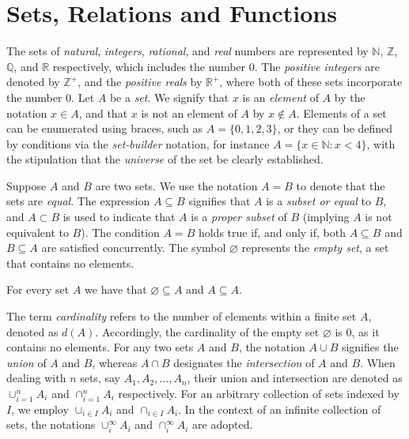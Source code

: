 %
%

\section{Sets, Relations and Functions}
\label{sec:sets}

The sets of \emph{natural}, \emph{integers}, \emph{rational}, and \emph{real} numbers are represented by $\mathbb{N}$, $\mathbb{Z}$, $\mathbb{Q}$, and $\mathbb{R}$ respectively, which includes the number $0$. The \emph{positive integers} are denoted by $\mathbb{Z}^+$, and the \emph{positive reals} by $\mathbb{R}^+$, where both of these sets incorporate the number $0$. Let $A$ be a \emph{set}. We signify that $x$ is an \emph{element} of $A$ by the notation $x\in A$, and that $x$ is not an element of $A$ by $x \notin A$. Elements of a set can be enumerated using braces, such as $A = \{0, 1, 2, 3\}$, or they can be defined by conditions via the \emph{set-builder} notation, for instance $A = \{x \in \mathbb{N} : x < 4\}$, with the stipulation that the \emph{universe} of the set be clearly established.

Suppose $A$ and $B$ are two sets. We use the notation $A = B$ to denote that the sets are \emph{equal}. The expression $A \subseteq B$ signifies that $A$ is a \emph{subset or equal} to $B$, and $A \subset B$ is used to indicate that $A$ is a \emph{proper subset} of $B$ (implying $A$ is not equivalent to $B$). The condition $A = B$ holds true if, and only if, both $A \subseteq B$ and $B \subseteq A$ are satisfied concurrently. The symbol $\varnothing$ represents the \emph{empty set}, a set that contains no elements.

\begin{example}
For every set $A$ we have that $\varnothing \subseteq A$ and $ A \subseteq A$.
\end{example}

The term \emph{cardinality} refers to the number of elements within a finite set $A$, denoted as $d(A)$. Accordingly, the cardinality of the empty set $\varnothing$ is 0, as it contains no elements. For any two sets $A$ and $B$, the notation $A \cup B$ signifies the \emph{union} of $A$ and $B$, whereas $A \cap B$ designates the \emph{intersection} of $A$ and $B$. When dealing with $n$ sets, say $A_1, A_2, \ldots, A_n$, their union and intersection are denoted as $\cup_{i=1}^n A_i$ and $\cap_{i=1}^n A_i$ respectively. For an arbitrary collection of sets indexed by $I$, we employ $\cup_{i \in I} A_i$ and $\cap_{i \in I} A_i$. In the context of an infinite collection of sets, the notations $\cup_{i}^{\infty} A_i$ and $\cap_{i}^{\infty} A_i$ are adopted.

